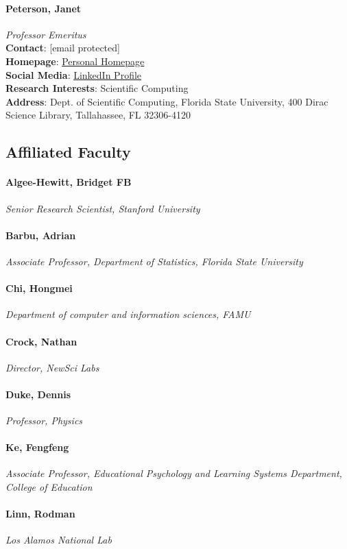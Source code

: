 \documentclass[12pt,a4paper]{article}
\begin{document}
\paragraph{Peterson, Janet}
\textit{Professor Emeritus}\\
\textbf{Contact}: [email protected]\\
\textbf{Homepage}: \href{http://people.sc.fsu.edu/~jpeterson/}{Personal Homepage}\\
\textbf{Social Media}: \href{https://www.linkedin.com/in/janet-peterson-14022a4/}{LinkedIn Profile}\\
\textbf{Research Interests}: Scientific Computing\\
\textbf{Address}: Dept. of Scientific Computing, Florida State University, 400 Dirac Science Library, Tallahassee, FL 32306-4120

\subsection{Affiliated Faculty}

\paragraph{Algee-Hewitt, Bridget FB}
\textit{Senior Research Scientist, Stanford University}
\paragraph{Barbu, Adrian}
\textit{Associate Professor, Department of Statistics, Florida State University}
\paragraph{Chi, Hongmei}
\textit{Department of computer and information sciences, FAMU}
\paragraph{Crock, Nathan}
\textit{Director, NewSci Labs}
\paragraph{Duke, Dennis}
\textit{Professor, Physics}
\paragraph{Ke, Fengfeng}
\textit{Associate Professor, Educational Psychology and Learning Systems Department, College of Education}
\paragraph{Linn, Rodman}
\textit{Los Alamos National Lab}
\end{document}
